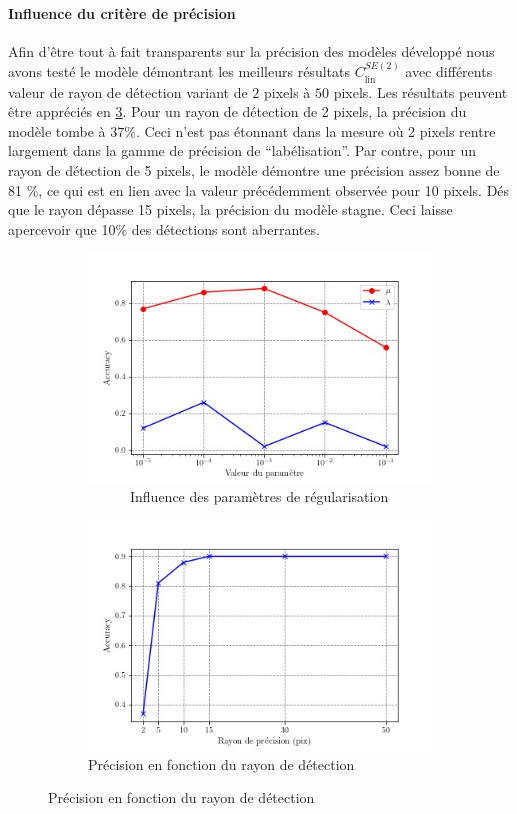\documentclass{article}
\begin{document}
\paragraph{Influence du critère de précision}
Afin d'être tout à fait transparents sur la précision des modèles développé nous avons testé le modèle démontrant les meilleurs 
résultats $C_{\text{lin}}^{SE(2)}$ avec différents valeur de rayon de détection variant de $2$ pixels à $50$ pixels. Les résultats 
peuvent être appréciés en \ref{fig:radius}. Pour un rayon de détection de 2 pixels, la précision du modèle tombe à $37 \%$. Ceci n'est pas 
étonnant dans la mesure où 2 pixels rentre largement dans la gamme de précision de ``labélisation''. Par contre, pour un rayon de détection de 5 pixels, 
le modèle démontre une précision assez bonne de 81 \%, ce qui est en lien avec la valeur précédemment observée pour 10 pixels. Dés que le rayon dépasse 
15 pixels, la précision du modèle stagne. Ceci laisse apercevoir que 10\% des détections sont aberrantes.

\begin{figure}[t]
\centering
\hspace*{-5em}%
\begin{subfigure}{.6\textwidth}
\includegraphics[scale=0.65]{plots/parameter_score_C_D_lin_R2.jpg}%
  \caption{$ \quad \quad \quad $Influence des paramètres de régularisation}%
    \label{fig:param}
\end{subfigure}%
\begin{subfigure}{.6\textwidth}
  \includegraphics[scale=0.65]{plots/radius_scores.jpg}
  \caption{ Précision en fonction du rayon de détection}%
  \label{fig:radius}
\end{subfigure}
\end{figure}
\end{document}
